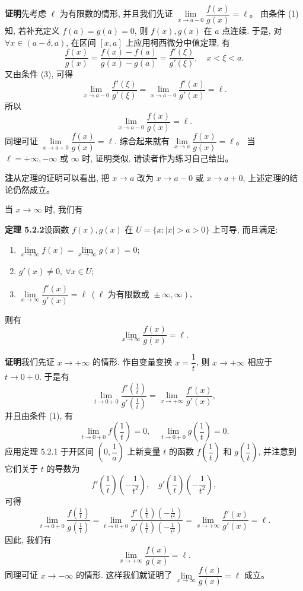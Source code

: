 \documentclass[UTF8, 12pt, fontset=fandol, oneside]{ctexart}
\begin{document}
\noindent\textbf{证明}\quad 先考虑 $\ell$ 为有限数的情形, 并且我们先证 $\lim\limits_{x\to a-0}\dfrac{f(x)}{g(x)}=\ell$。
由条件 (1) 知, 若补充定义 $f(a)=g(a)=0$, 则 $f(x),g(x)$ 在 $a$ 点连续. 于是, 对 $\forall x\in(a-\delta,a)$, 在区间 $[x,a]$ 上应用柯西微分中值定理, 有
\[
  \frac{f(x)}{g(x)}
  =
  \frac{f(x)-f(a)}{g(x)-g(a)}
  =
  \frac{f'(\xi)}{g'(\xi)},\quad x<\xi<a.
\]
又由条件 (3), 可得
\[
  \lim_{x\to a-0}\frac{f'(\xi)}{g'(\xi)}
  =
  \lim_{x\to a-0}\frac{f'(x)}{g'(x)}
  =
  \ell.
\]
所以
\[
  \lim_{x\to a-0}\frac{f(x)}{g(x)}=\ell.
\]
同理可证 $\lim\limits_{x\to a+0}\dfrac{f(x)}{g(x)}=\ell$. 综合起来就有 $\lim\limits_{x\to a}\dfrac{f(x)}{g(x)}=\ell$。
当 $\ell=+\infty,-\infty$ 或 $\infty$ 时, 证明类似, 请读者作为练习自己给出。

\noindent\textbf{注}\quad 从定理的证明可以看出, 把 $x\to a$ 改为 $x\to a-0$ 或 $x\to a+0$, 上述定理的结论仍然成立。

当 $x\to\infty$ 时, 我们有

\noindent\textbf{定理 5.2.2}\quad 设函数 $f(x),g(x)$ 在 $U=\{x: |x|>a>0\}$ 上可导, 而且满足:
\begin{enumerate}
  \item $\lim\limits_{x\to\infty}f(x)=\lim\limits_{x\to\infty}g(x)=0$;
  \item $g'(x)\ne0,\ \forall x\in U$;
  \item $\lim\limits_{x\to\infty}\dfrac{f'(x)}{g'(x)}=\ell\ (\ell\text{ 为有限数或 }\pm\infty,\infty)$,
\end{enumerate}
则有
\[
  \lim_{x\to\infty}\frac{f(x)}{g(x)}=\ell.
\]

\noindent\textbf{证明}\quad 我们先证 $x\to+\infty$ 的情形. 作自变量变换 $x=\dfrac1t$, 则 $x\to+\infty$ 相应于 $t\to0+0$. 于是有
\[
  \lim_{t\to0+0}
  \frac{f'\left(\frac1t\right)}
       {g'\left(\frac1t\right)}
  =
  \lim_{x\to+\infty}\frac{f'(x)}{g'(x)},
\]
并且由条件 (1), 有
\[
  \lim_{t\to0+0}f\left(\frac1t\right)=0,\quad
  \lim_{t\to0+0}g\left(\frac1t\right)=0.
\]
应用定理 5.2.1 于开区间 $\left(0,\dfrac1a\right)$ 上新变量 $t$ 的函数 $f\left(\dfrac1t\right)$ 和 $g\left(\dfrac1t\right)$, 并注意到它们关于 $t$ 的导数为
\[
  f'\left(\frac1t\right)\left(-\frac1{t^2}\right),\quad
  g'\left(\frac1t\right)\left(-\frac1{t^2}\right),
\]
可得
\[
  \lim_{t\to0+0}
  \frac{f\left(\frac1t\right)}
       {g\left(\frac1t\right)}
  =
  \lim_{t\to0+0}
  \frac{f'\left(\frac1t\right)\left(-\frac1{t^2}\right)}
       {g'\left(\frac1t\right)\left(-\frac1{t^2}\right)}
  =
  \lim_{x\to+\infty}\frac{f'(x)}{g'(x)}
  =
  \ell.
\]
因此, 我们有
\[
  \lim_{x\to+\infty}\frac{f(x)}{g(x)}=\ell.
\]
同理可证 $x\to-\infty$ 的情形. 这样我们就证明了 $\lim\limits_{x\to\infty}\dfrac{f(x)}{g(x)}=\ell$ 成立。
\end{document}

